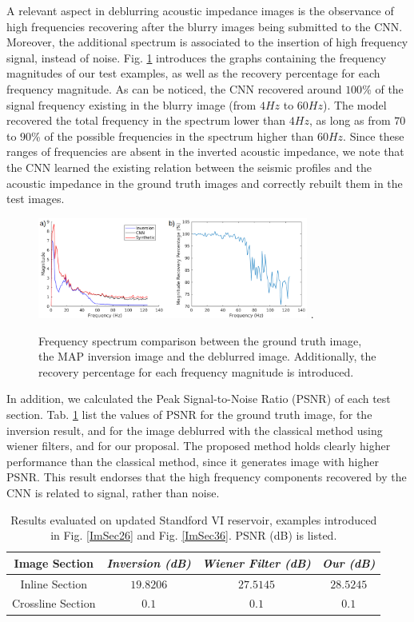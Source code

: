\documentclass[journal]{IEEEtran}
\begin{document}
A relevant aspect in deblurring acoustic impedance images
is the observance of high frequencies recovering after the
blurry images being submitted to the CNN. Moreover, the
additional spectrum is associated to the insertion
of high frequency signal, instead of noise.
Fig. \ref{frequencies} introduces the graphs containing the frequency
magnitudes of our test examples, as well as the recovery percentage
for each frequency magnitude. As can be noticed,
the CNN recovered around $100$\% of the signal frequency existing
in the blurry image (from $4Hz$ to $60Hz$). The model recovered
the total frequency in the spectrum lower than
$4Hz$, as long as from $70$ to $90$\% of the possible frequencies
in the spectrum higher than $60Hz$.
Since these ranges of frequencies are absent in the inverted acoustic
impedance, we note that the CNN learned the existing relation between the
seismic profiles and the acoustic impedance in the ground truth images
and correctly rebuilt them in the test images.
\begin{figure}[!t]
\centering
\includegraphics[width=3.5in]{Figs/frequencies}
\DeclareGraphicsExtensions.
\caption{Frequency spectrum comparison between the ground truth image,
the MAP inversion image and the deblurred image. Additionally, the recovery percentage
for each frequency magnitude is introduced.}
\label{frequencies}
\end{figure}

In addition, we calculated the Peak Signal-to-Noise Ratio (PSNR) of each
test section. Tab. \ref{table_results} list the values of PSNR for the
ground truth image, for the inversion result, and
for the image deblurred with the classical method using wiener
filters, and for our proposal. The proposed method holds clearly
higher performance than the classical method, since it generates
image with higher PSNR. This result endorses that the high frequency
components recovered by the CNN is related to signal, rather than noise.
\begin{table}[!t]
\renewcommand{\arraystretch}{1.3}
\caption{Results evaluated on updated Standford VI reservoir, examples
introduced in Fig. \ref{ImSec26} and Fig. \ref{ImSec36}. PSNR (dB) is listed.}
\label{table_results}
\centering
\begin{tabular}{|c||c||c||c|}
\hline
 \textbf{Image Section} & \textbf{\textit{Inversion (dB)}} & \textbf{\textit{Wiener Filter (dB)}} & \textbf{\textit{Our (dB)}} \\
\hline
Inline Section & $19.8206$ & $27.5145$ & $28.5245$ \\
\hline
Crossline Section & $0.1$ & $0.1$ & $0.1$ \\
\hline
\end{tabular}
\end{table}
\end{document}
